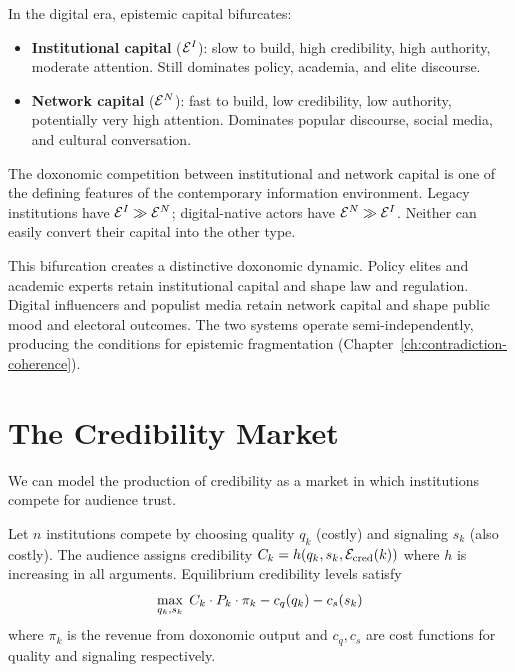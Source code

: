 \begin{model}
\label{mod:two-tier}
In the digital era, epistemic capital bifurcates:
\begin{itemize}[nosep]
  \item \textbf{Institutional capital} ($\mathcal{E}^I$): slow to build, high credibility, high authority, moderate attention.
  Still dominates policy, academia, and elite discourse.
  \item \textbf{Network capital} ($\mathcal{E}^N$): fast to build, low credibility, low authority, potentially very high attention.
  Dominates popular discourse, social media, and cultural conversation.
\end{itemize}
The doxonomic competition between institutional and network capital is one of the defining features of the contemporary information environment.
Legacy institutions have $\mathcal{E}^I \gg \mathcal{E}^N$; digital-native actors have $\mathcal{E}^N \gg \mathcal{E}^I$.
Neither can easily convert their capital into the other type.
\end{model}

This bifurcation creates a distinctive doxonomic dynamic.
Policy elites and academic experts retain institutional capital and shape law and regulation.
Digital influencers and populist media retain network capital and shape public mood and electoral outcomes.
The two systems operate semi-independently, producing the conditions for epistemic fragmentation (Chapter~\ref{ch:contradiction-coherence}).


\section{The Credibility Market}
\label{sec:ch6-market}

We can model the production of credibility as a market in which institutions compete for audience trust.

\begin{model}
\label{mod:credibility-market}
Let $n$ institutions compete by choosing quality $q_k$ (costly) and signaling $s_k$ (also costly).
The audience assigns credibility $C_{k} = h(q_k, s_k, \mathcal{E}_{\text{cred}}(k))$ where $h$ is increasing in all arguments.
Equilibrium credibility levels satisfy
\[
  \max_{q_k, s_k} \; C_{k} \cdot P_{k} \cdot \pi_k - c_q(q_k) - c_s(s_k)
\]
where $\pi_k$ is the revenue from doxonomic output and $c_q, c_s$ are cost functions for quality and signaling respectively.
\end{model}

